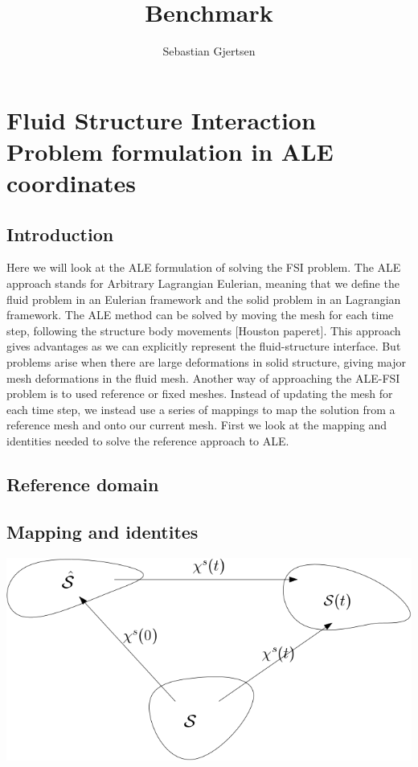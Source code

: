 
\usepackage{listings}
\usepackage{amsmath}
\title{Benchmark}
\author{Sebastian Gjertsen}

\maketitle

\section*{Fluid Structure Interaction Problem formulation in ALE coordinates}
\subsection*{Introduction}
Here we will look at the ALE formulation of solving the FSI problem. The ALE approach stands for Arbitrary Lagrangian Eulerian, meaning that we define the fluid problem in an Eulerian framework and the solid problem in an Lagrangian framework. The ALE method can be solved by moving the mesh for each time step, following the structure body movements [Houston paperet]. This approach gives advantages as we can explicitly represent the fluid-structure interface. But problems arise when there are large deformations in solid structure, giving major mesh deformations in the fluid mesh. Another way of approaching the ALE-FSI problem is to used reference or fixed meshes. Instead of updating the mesh for each time step, we instead use a series of mappings to map the solution from a reference mesh and onto our current mesh. First we look at the mapping and identities needed to solve the reference approach to ALE.
\subsection*{Reference domain}
\subsection*{Mapping and identites}
\includegraphics[scale=0.4]{continuum_mapping.png}

